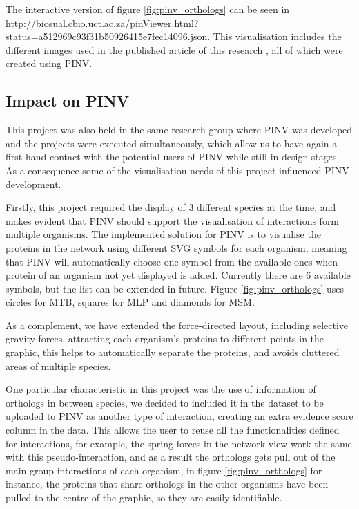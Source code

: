 The interactive version of figure \ref{fig:pinv_orthologs} can be seen in \url{http://biosual.cbio.uct.ac.za/pinViewer.html?status=a512969c93f31b50926415e7fec14096.json}. This visualisation includes the different images used in the published article of this research \cite{AKI2013}, all of which were created using PINV.

\subsection{Impact on PINV}
This project was also held in the same research group where PINV was developed and the projects were executed simultaneously, which allow us to have again a first hand contact with the potential users of PINV while still in design stages. As a consequence some of the visualisation needs of this project influenced PINV development.

Firstly, this project required the display of 3 different species at the time, and makes evident that PINV should support the visualisation of interactions form multiple organisms. The implemented solution for PINV is to visualise the proteins in the network using different SVG symbols for each organism,  meaning that PINV will automatically choose one symbol from the available ones when protein of an organism not yet displayed is added. Currently there are 6 available symbols, but the list can be extended in future. Figure \ref{fig:pinv_orthologs} uses circles for MTB, squares for MLP and diamonds for MSM.

As a complement, we have extended the force-directed layout, including selective gravity forces, attracting each organism's proteins to different points in the graphic, this helps to automatically separate the proteins, and avoids cluttered areas of multiple species.

One particular characteristic in this project was the use of information of orthologs in between species, we decided to included it in the dataset to be uploaded to PINV as another type of interaction, creating an extra evidence score column in the data. This allows the user to reuse all the functionalities defined for interactions, for example, the spring forces in the network view work the same with this pseudo-interaction, and as a result the orthologs gets pull out of the main group interactions of each organism, in figure \ref{fig:pinv_orthologs} for instance, the proteins that share orthologs in the other organisms have been pulled to the centre of the graphic, so they are easily identifiable.


